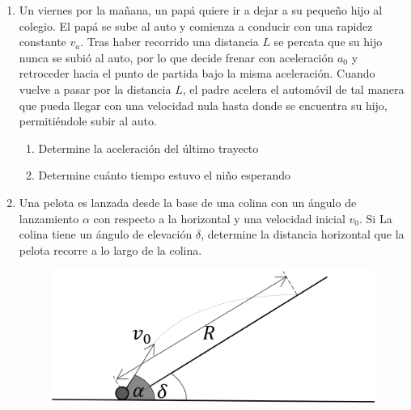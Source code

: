 \documentclass[letterpaper,11pt]{article}
\begin{document}
\begin{enumerate}
\begin{multicols}{2}
\begin{enumerate}
    \item La distancia que separa a las ventanas por las cuales sale e ingresa el proyectil.
    
    \item La rapidez que tiene el proyectil al momento de ingresar por la ventana.
\end{enumerate}

\columnbreak

\begin{figure}[H]
    \centering
    
\end{figure}

\end{multicols}

\item Un viernes por la mañana, un papá quiere ir a dejar a su pequeño hijo al colegio. El papá se sube al auto y comienza a conducir con una rapidez constante $v_a$. Tras haber recorrido una distancia $L$ se percata que su hijo nunca se subió al auto, por lo que decide frenar con aceleración $a_{0}$ y retroceder hacia el punto de partida bajo la misma aceleración. Cuando vuelve a pasar por la distancia $L$, el padre acelera el automóvil de tal manera que pueda llegar con una velocidad nula hasta donde se encuentra su hijo, permitiéndole subir al auto.

\begin{enumerate}
    \item Determine la aceleración del último trayecto
    \item Determine cuánto tiempo estuvo el niño esperando
\end{enumerate}

\item 
\begin{multicols}{2}
    Una pelota es lanzada desde la base de una colina con un ángulo de lanzamiento $\alpha$ con respecto a la horizontal y una velocidad inicial $v_0$. Si La colina tiene un ángulo de elevación $\delta$, determine la distancia horizontal que la pelota recorre a lo largo de la colina.

    \columnbreak
    
    \begin{figure}[H]
        \centering
        \includegraphics[width=0.8\linewidth]{2023-1/img/TD 2/plano.png}
    \end{figure}
\end{multicols}



\end{enumerate}
\end{document}
